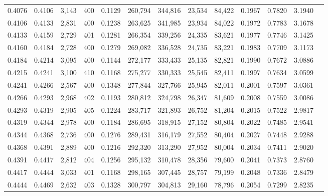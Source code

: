 \begin{tabular}{rrrrrrrrrrrrr}
0.4076 & 0.4106 & 3,143 & 400 &                                     0.1129 & 260,794 & 344,816 &  23,534 &  84,422 & 0.1967 & 0.7820 & 3.1940 \\
0.4106 & 0.4133 & 2,831 & 400 &                                     0.1238 & 263,625 & 341,985 &  23,934 &  84,022 & 0.1972 & 0.7783 & 3.1678 \\
0.4133 & 0.4159 & 2,729 & 401 &                                     0.1281 & 266,354 & 339,256 &  24,335 &  83,621 & 0.1977 & 0.7746 & 3.1425 \\
0.4160 & 0.4184 & 2,728 & 400 &                                     0.1279 & 269,082 & 336,528 &  24,735 &  83,221 & 0.1983 & 0.7709 & 3.1173 \\
0.4184 & 0.4214 & 3,095 & 400 &                                     0.1144 & 272,177 & 333,433 &  25,135 &  82,821 & 0.1990 & 0.7672 & 3.0886 \\
0.4215 & 0.4241 & 3,100 & 410 &                                     0.1168 & 275,277 & 330,333 &  25,545 &  82,411 & 0.1997 & 0.7634 & 3.0599 \\
0.4241 & 0.4266 & 2,567 & 400 &                                     0.1348 & 277,844 & 327,766 &  25,945 &  82,011 & 0.2001 & 0.7597 & 3.0361 \\
0.4266 & 0.4293 & 2,968 & 402 &                                     0.1193 & 280,812 & 324,798 &  26,347 &  81,609 & 0.2008 & 0.7559 & 3.0086 \\
0.4293 & 0.4319 & 2,905 & 405 &                                     0.1224 & 283,717 & 321,893 &  26,752 &  81,204 & 0.2015 & 0.7522 & 2.9817 \\
0.4319 & 0.4344 & 2,978 & 400 &                                     0.1184 & 286,695 & 318,915 &  27,152 &  80,804 & 0.2022 & 0.7485 & 2.9541 \\
0.4344 & 0.4368 & 2,736 & 400 &                                     0.1276 & 289,431 & 316,179 &  27,552 &  80,404 & 0.2027 & 0.7448 & 2.9288 \\
0.4368 & 0.4391 & 2,889 & 400 &                                     0.1216 & 292,320 & 313,290 &  27,952 &  80,004 & 0.2034 & 0.7411 & 2.9020 \\
0.4391 & 0.4417 & 2,812 & 404 &                                     0.1256 & 295,132 & 310,478 &  28,356 &  79,600 & 0.2041 & 0.7373 & 2.8760 \\
0.4417 & 0.4444 & 3,033 & 401 &                                     0.1168 & 298,165 & 307,445 &  28,757 &  79,199 & 0.2048 & 0.7336 & 2.8479 \\
0.4444 & 0.4469 & 2,632 & 403 &                                     0.1328 & 300,797 & 304,813 &  29,160 &  78,796 & 0.2054 & 0.7299 & 2.8235 \\

\end{tabular}
